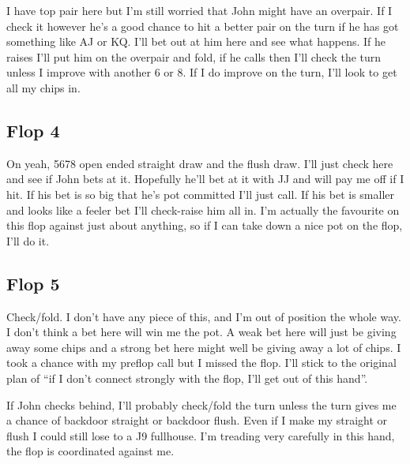 \begin{cards}
\crdsixd\crdtwos\crdtwoc%
\end{cards}

I have top pair here but I'm still worried that John might have
an overpair. If I check it however he's a good chance to hit
a better pair on the turn if he has got something like AJ or KQ.
I'll bet out at him here and see what happens. If he raises I'll
put him on the overpair and fold, if he calls then I'll check the
turn unless I improve with another 6 or 8. If I do improve on the turn,
I'll look to get all my chips in.

\subsection*{Flop 4}

\begin{cards}
\crdsevh\crdtwoc\crdfivec%
\end{cards}

On yeah, 5678 open ended straight draw and the flush draw. I'll just check here and
see if John bets at it. Hopefully he'll bet at it with JJ and
will pay me off if I hit. If his bet is so big that he's pot
committed I'll just call. If his bet is smaller and looks like
a feeler bet I'll check-raise him all in. I'm actually the
favourite on this flop against just about anything, so if I
can take down a nice pot on the flop, I'll do it.

\subsection*{Flop 5}

\begin{cards}
\crdJh\crdnineh\crdninec%
\end{cards}

Check/fold. I don't have any piece of this, and I'm out of
position the whole way. I don't think a bet here will win me
the pot. A weak bet here will just be giving away some chips
and a strong bet here might well be giving away a lot of chips.
I took a chance with my preflop call but I missed the flop.
I'll stick to the original plan of ``if I don't connect strongly with
the flop, I'll get out of this hand''.

If John checks behind, I'll probably check/fold the
turn unless the turn gives me a chance of backdoor straight
or backdoor flush. Even if I make my straight or flush I could
still lose to a J9 fullhouse. I'm treading very carefully in
this hand, the flop is coordinated against me.



